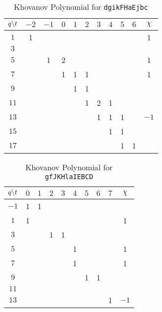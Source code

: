\documentclass{article}
\theoremstyle{plain}
\begin{document}
        \begin{table}[H]
            \centering
            \begin{tabular}{| c | c | c | c | c | c | c | c | c | c | c |}
                \hline
                $q\symbol{92}t$&$-2$&$-1$&$0$&$1$&$2$&$3$&$4$&$5$&$6$&$\chi$\\
                \hline
                $1$&1&&&&&&&&&1\\
                \hline
                $3$&&&&&&&&&&\\
                \hline
                $5$&&1&2&&&&&&&1\\
                \hline
                $7$&&&1&1&1&&&&&1\\
                \hline
                $9$&&&&1&1&&&&&\\
                \hline
                $11$&&&&&1&2&1&&&\\
                \hline
                $13$&&&&&&1&1&1&&$-1$\\
                \hline
                $15$&&&&&&&1&1&&\\
                \hline
                $17$&&&&&&&&1&1&\\
                \hline
            \end{tabular}
            \caption{Khovanov Polynomial for \texttt{dgikFHaEjbc}}
            \label{table:dgikFHaEjbc_kho}
        \end{table}
        \begin{table}[H]
            \centering
            \begin{tabular}{| c | c | c | c | c | c | c | c | c | c |}
                \hline
                $q\symbol{92}t$&$0$&$1$&$2$&$3$&$4$&$5$&$6$&$7$&$\chi$\\
                \hline
                $-1$&1&1&&&&&&&\\
                \hline
                $1$&1&&&&&&&&1\\
                \hline
                $3$&&&1&1&&&&&\\
                \hline
                $5$&&&&&1&&&&1\\
                \hline
                $7$&&&&&1&&&&1\\
                \hline
                $9$&&&&&&1&1&&\\
                \hline
                $11$&&&&&&&&&\\
                \hline
                $13$&&&&&&&&1&$-1$\\
                \hline
            \end{tabular}
            \caption{Khovanov Polynomial for \texttt{gfJKHlaIEBCD}}
            \label{table:gfJKHlaIEBCD_kho}
        \end{table}
\end{document}
